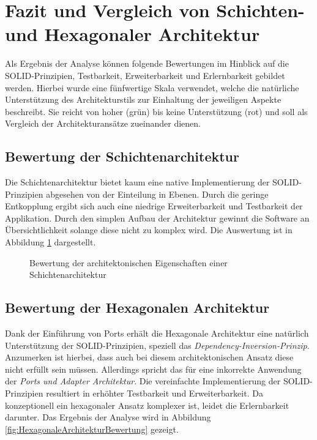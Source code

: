 \documentclass[conference]{IEEEtran}
\begin{document}
\section{Fazit und Vergleich von Schichten- und Hexagonaler Architektur} 

Als Ergebnis der Analyse können folgende Bewertungen im Hinblick auf die SOLID-Prinzipien, Testbarkeit, Erweiterbarkeit und Erlernbarkeit gebildet werden. Hierbei wurde eine fünfwertige Skala verwendet, welche die natürliche Unterstützung des Architekturstils zur Einhaltung der jeweiligen Aspekte beschreibt. Sie reicht von hoher (grün) bis keine Unterstützung (rot) und soll als Vergleich der Architekturansätze zueinander dienen.

\subsection{Bewertung der Schichtenarchitektur}

Die Schichtenarchitektur bietet kaum eine native Implementierung der SOLID-Prinzipien abgesehen von der Einteilung in Ebenen. Durch die geringe Entkopplung ergibt sich auch eine niedrige Erweiterbarkeit und Testbarkeit der Applikation. Durch den simplen Aufbau der Architektur gewinnt die Software an Übersichtlichkeit solange diese nicht zu komplex wird. Die Auswertung ist in Abbildung \ref{ref:SchichtenarchitekturBewertung} dargestellt.

\begin{figure}[htbp]
	
	\caption{Bewertung der architektonischen Eigenschaften einer Schichtenarchitektur}
	\label{ref:SchichtenarchitekturBewertung}
\end{figure}

\subsection{Bewertung der Hexagonalen Architektur}

Dank der Einführung von Ports erhält die Hexagonale Architektur eine natürlich Unterstützung der SOLID-Prinzipien, speziell das \emph{Dependency-Inversion-Prinzip}. Anzumerken ist hierbei, dass auch bei diesem architektonischen Ansatz diese nicht erfüllt sein müssen. Allerdings spricht das für eine inkorrekte Anwendung der \emph{Ports und Adapter Architektur}. Die vereinfachte Implementierung der SOLID-Prinzipien resultiert in erhöhter Testbarkeit und Erweiterbarkeit. Da konzeptionell ein hexagonaler Ansatz komplexer ist, leidet die Erlernbarkeit darunter. Das Ergebnis der Analyse wird in Abbildung \ref{fig:HexagonaleArchitekturBewertung} gezeigt.
\end{document}
